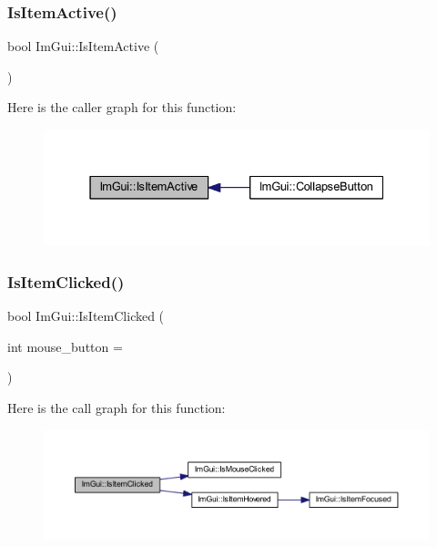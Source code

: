 \subsubsection{\texorpdfstring{Is\+Item\+Active()}{IsItemActive()}}
{\footnotesize\ttfamily bool Im\+Gui\+::\+Is\+Item\+Active (\begin{DoxyParamCaption}{ }\end{DoxyParamCaption})}

Here is the caller graph for this function\+:
\nopagebreak
\begin{figure}[H]
\begin{center}
\leavevmode
\includegraphics[width=331pt]{namespace_im_gui_a2d8ac4569456a8003e4dddd39caf771c_icgraph}
\end{center}
\end{figure}
\mbox{\label{namespace_im_gui_a0b5780dbd580e28f5d31f39da80b0b01}} 
\subsubsection{\texorpdfstring{Is\+Item\+Clicked()}{IsItemClicked()}}
{\footnotesize\ttfamily bool Im\+Gui\+::\+Is\+Item\+Clicked (\begin{DoxyParamCaption}\item[{int}]{mouse\+\_\+button = {} }\end{DoxyParamCaption})}

Here is the call graph for this function\+:
\nopagebreak
\begin{figure}[H]
\begin{center}
\leavevmode
\includegraphics[width=350pt]{namespace_im_gui_a0b5780dbd580e28f5d31f39da80b0b01_cgraph}
\end{center}
\end{figure}
\mbox{\label{namespace_im_gui_ada3b1cb76907bb9e630b2482f52f0599}} 
